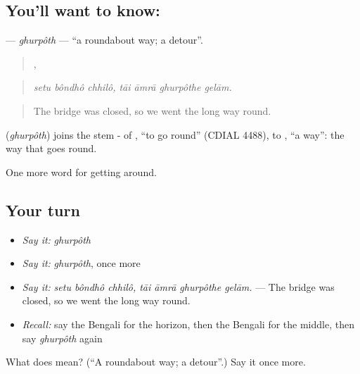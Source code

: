 \subsection*{You'll want to know: }
\textbf{} — \emph{ghurpôth} — \textquotedblleft{}a roundabout way; a detour\textquotedblright{}.

\begin{quote}
  ,    
\end{quote}

\begin{quote}
\emph{setu bôndhô chhilô, tāi āmrā ghurpôthe gelām.}
\end{quote}

\begin{quote}
The bridge was closed, so we went the long way round.
\end{quote}

\begin{cousinweb}
\textbf{} (\emph{ghurpôth}) joins the stem - of , \textquotedblleft{}to go round\textquotedblright{} (CDIAL 4488), to \textbf{}, \textquotedblleft{}a way\textquotedblright{}: the way that goes round.
\end{cousinweb}

\begin{grammarlens}[title={What you've built}]
One more word for getting around.
\end{grammarlens}

\subsection*{Your turn}
\begin{itemize}
\raggedright
  \item \emph{Say it:} \emph{ghurpôth}
  \item \emph{Say it:} \emph{ghurpôth}, once more
  \item \emph{Say it:} \emph{setu bôndhô chhilô, tāi āmrā ghurpôthe gelām.} — The bridge was closed, so we went the long way round.
  \item \emph{Recall:} say the Bengali for the horizon, then the Bengali for the middle, then say \emph{ghurpôth} again
\end{itemize}

\begin{tcolorbox}[breakable,colback=teal!4,colframe=teal!35!black,title={Before you move on}]
What does  mean? (\textquotedblleft{}A roundabout way; a detour\textquotedblright{}.) Say it once more.
\end{tcolorbox}
